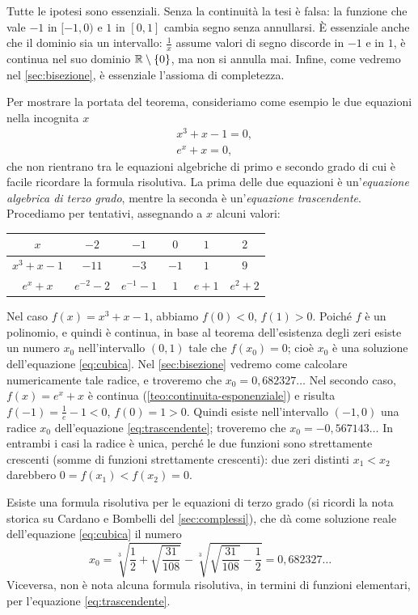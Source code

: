 Tutte le ipotesi sono essenziali. Senza la continuità la tesi è falsa: la funzione che
vale $-1$ in $[-1,0)$ e $1$ in $[0,1]$ cambia segno senza annullarsi. È essenziale anche
che il dominio sia un intervallo: $\frac1x$ assume valori di segno discorde in $-1$ e in
$1$, è continua nel suo dominio $\mathbb{R}\setminus\{0\}$, ma non si annulla mai. Infine, come
vedremo nel \cref{sec:bisezione}, è essenziale l'assioma di completezza.

Per mostrare la portata del teorema, consideriamo come esempio le due equazioni nella
incognita $x$
\begin{align}
  &x^{3}+x-1=0, \label{eq:cubica}\\
  &e^{x}+x=0, \label{eq:trascendente}
\end{align}
che non rientrano tra le equazioni algebriche di primo e secondo grado di cui è facile
ricordare la formula risolutiva. La prima delle due equazioni è un'\emph{equazione
algebrica di terzo grado}, mentre la seconda è un'\emph{equazione trascendente}.
Procediamo per tentativi, assegnando a $x$ alcuni valori:
\begin{center}
\renewcommand{\arraystretch}{1.4}
\begin{tabular}{c|ccccc}
  $x$ & $-2$ & $-1$ & $0$ & $1$ & $2$\\ \hline
  $x^{3}+x-1$ & $-11$ & $-3$ & $-1$ & $1$ & $9$\\
  $e^{x}+x$ & $e^{-2}-2$ & $e^{-1}-1$ & $1$ & $e+1$ & $e^{2}+2$
\end{tabular}
\end{center}
Nel caso $f(x)=x^{3}+x-1$, abbiamo $f(0)<0$, $f(1)>0$. Poiché $f$ è un polinomio, e
quindi è continua, in base al teorema dell'esistenza degli zeri esiste un numero $x_{0}$
nell'intervallo $(0,1)$ tale che $f(x_{0})=0$; cioè $x_{0}$ è una soluzione
dell'equazione \eqref{eq:cubica}. Nel \cref{sec:bisezione} vedremo come calcolare
numericamente tale radice, e troveremo che $x_{0}=0{,}682327\ldots$ Nel secondo caso,
$f(x)=e^{x}+x$ è continua (\cref{teo:continuita-esponenziale}) e risulta
$f(-1)=\frac1e-1<0$, $f(0)=1>0$. Quindi esiste nell'intervallo $(-1,0)$ una radice
$x_{0}$ dell'equazione \eqref{eq:trascendente}; troveremo che $x_{0}=-0{,}567143\ldots$
In entrambi i casi la radice è unica, perché le due funzioni sono strettamente crescenti
(somme di funzioni strettamente crescenti): due zeri distinti $x_{1}<x_{2}$ darebbero
$0=f(x_{1})<f(x_{2})=0$.

Esiste una formula risolutiva per le equazioni di terzo grado (si ricordi la nota storica
su Cardano e Bombelli del \cref{sec:complessi}), che dà come soluzione reale
dell'equazione \eqref{eq:cubica} il numero
\begin{equation}\label{eq:cardano}
  x_{0}=\sqrt[3]{\frac12+\sqrt{\frac{31}{108}}}-\sqrt[3]{\sqrt{\frac{31}{108}}-\frac12}
  =0{,}682327\ldots
\end{equation}
Viceversa, non è nota alcuna formula risolutiva, in termini di funzioni elementari, per
l'equazione \eqref{eq:trascendente}.

